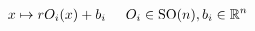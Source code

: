 \documentclass[preview]{standalone}
\begin{document}
\begin{align*}
x \mapsto r O_i(x) + b_i\hspace{0.5 cm} O_i \in \text{SO}(n), b_i \in \mathbb{R}^n \\
\end{align*}
\end{document}
